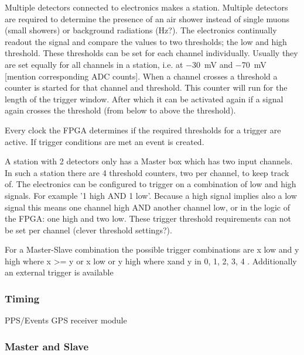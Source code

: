 Multiple detectors connected to \hisparc electronics makes a station. Multiple detectors are required to determine the presence of an air shower instead of single muons (small showers) or background radiations (Hz?). The \hisparc electronics continually readout the signal and compare the \adc values to two thresholds; the low and high threshold. These thresholds can be set for each channel individually. Usually they are set equally for all channels in a station, i.e. at \SI{-30}{\milli\volt} and \SI{-70}{\milli\volt} [mention corresponding ADC counts]. When a channel crosses a threshold a counter is started for that channel and threshold. This counter will run for the length of the trigger window. After which it can be activated again if a signal again crosses the threshold (from below to above the threshold).

Every clock the FPGA determines if the required thresholds for a trigger are active. If trigger conditions are met an event is created.

A station with 2 detectors only has a Master box which has two input channels. In such a station there are 4 threshold counters, two per channel, to keep track of. The electronics can be configured to trigger on a combination of low and high signals. For example '1 high AND 1 low'. Because a high signal implies also a low signal this means one channel high AND another channel low, or in the logic of the FPGA: one high and two low. These trigger threshold requirements can not be set per channel (clever threshold settings?).

For a Master-Slave combination the possible trigger combinations are x low and y high where x >= y or x low or y high where xand y in 0, 1, 2, 3, 4 . Additionally an external trigger is available



\subsubsection{Timing}

PPS/Events
GPS receiver module \cite{trimble}


\subsubsection{Master and Slave}
\label{sub:masterslave}

